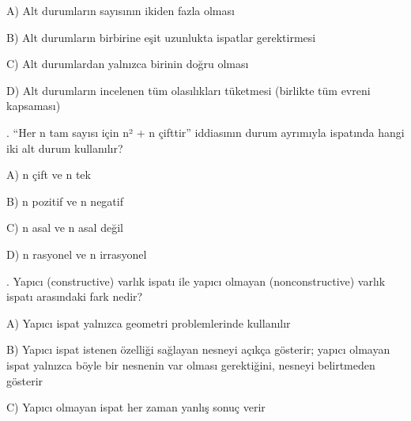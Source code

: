 \par\noindent\hspace*{1.6em}A) Alt durumların sayısının ikiden fazla olması

\par\noindent\hspace*{1.6em}B) Alt durumların birbirine eşit uzunlukta ispatlar gerektirmesi

\par\noindent\hspace*{1.6em}C) Alt durumlardan yalnızca birinin doğru olması

\par\noindent\hspace*{1.6em}D) Alt durumların incelenen tüm olasılıkları tüketmesi (birlikte tüm evreni kapsaması)

\par\smallskip{}. “Her n tam sayısı için n² + n çifttir” iddiasının durum ayrımıyla ispatında hangi iki alt durum kullanılır?

\par\noindent\hspace*{1.6em}A) n çift ve n tek

\par\noindent\hspace*{1.6em}B) n pozitif ve n negatif

\par\noindent\hspace*{1.6em}C) n asal ve n asal değil

\par\noindent\hspace*{1.6em}D) n rasyonel ve n irrasyonel

\par\smallskip{}. Yapıcı (constructive) varlık ispatı ile yapıcı olmayan (nonconstructive) varlık ispatı arasındaki fark nedir?

\par\noindent\hspace*{1.6em}A) Yapıcı ispat yalnızca geometri problemlerinde kullanılır

\par\noindent\hspace*{1.6em}B) Yapıcı ispat istenen özelliği sağlayan nesneyi açıkça gösterir; yapıcı olmayan ispat yalnızca böyle bir nesnenin var olması gerektiğini, nesneyi belirtmeden gösterir

\par\noindent\hspace*{1.6em}C) Yapıcı olmayan ispat her zaman yanlış sonuç verir

